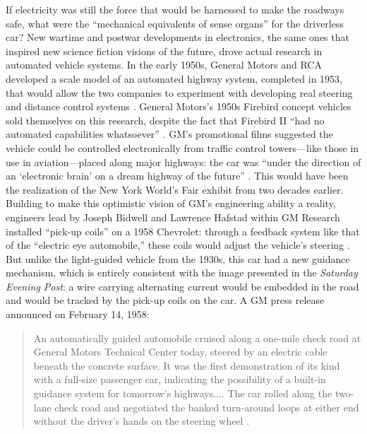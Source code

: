 If electricity was still the force that would be harnessed to make the
roadways safe, what were the ``mechanical equivalents of sense
organs'' \cite{wienerMachineThreat} for the driverless car? New
wartime and postwar developments in electronics, the same ones that
inspired new science fiction visions of the future, drove actual
research in automated vehicle systems. In the early 1950s, General
Motors and RCA developed a scale model of an automated highway system,
completed in 1953, that would allow the two companies to experiment
with developing real steering and distance control systems \cite[p. 6]{wetmore}.
General Motors's 1950s Firebird concept
vehicles sold themselves on this research, despite the fact that
Firebird II ``had no automated capabilities whatsoever'' \cite[p. 7]{wetmore}. GM's
promotional films suggested the vehicle could be controlled
electronically from traffic control towers---like those in use in
aviation---placed along major highways: the car was ``under the direction
of an `electronic brain' on a dream highway of the future'' \cite[p.
  7]{wetmore}. This 
would have been the realization of the New York World's Fair exhibit
from two decades earlier. Building to make
this optimistic vision of GM's engineering ability a reality,
engineers lead by Joseph Bidwell and Lawrence Hafstad within GM
Research installed ``pick-up coils'' on a 1958 Chevrolet: through a
feedback system like that of the ``electric eye automobile,'' these
coils would adjust the vehicle's steering \cite[p. 7]{wetmore}. But unlike the
light-guided vehicle from the 1930s, this car had a new guidance
mechanism, which is entirely consistent with the image presented in
the \emph{Saturday Evening Post}: a wire carrying alternating current would
be embedded in the road and would be tracked by the pick-up coils on
the car. A GM press release announced on February 14, 1958:
\begin{quote}
An automatically guided automobile cruised along a one-mile check road
at General Motors Technical Center today, steered by an electric cable
beneath the concrete surface. It was the first demonstration of its
kind with a full-size passenger car, indicating the possibility of a
built-in guidance system for tomorrow's highways.... The car rolled
along the two-lane check road and negotiated the banked turn-around
loops at either end without the driver's hands on the steering wheel
\cite[p. 7]{wetmore}.
\end{quote}

